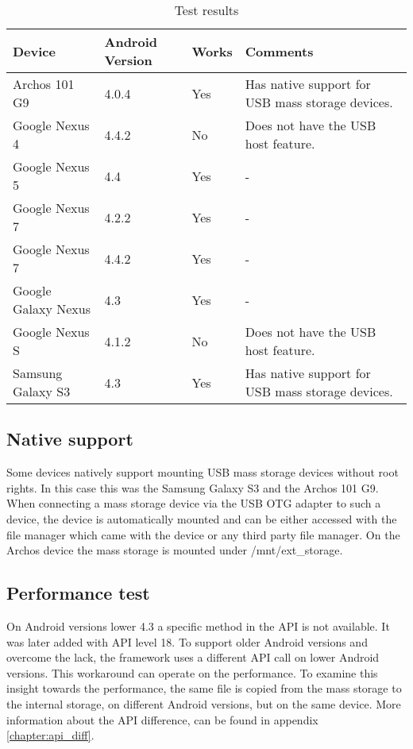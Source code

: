 \begin{table}[ht]
\caption{Test results}
\centering
\begin{tabular}{|l|l|l|p{7cm}|}
\hline\hline
\textbf{Device} & \textbf{Android Version} & \textbf{Works} & \textbf{Comments} \\ \hline
Archos 101 G9 & 4.0.4 & Yes & Has native support for USB mass storage devices. \\ \hline
Google Nexus 4 & 4.4.2 & No & Does not have the USB host feature\cite{nexus_4_usb_host}. \\ \hline
Google Nexus 5 & 4.4 & Yes & - \\ \hline
Google Nexus 7 & 4.2.2 & Yes & - \\ \hline
Google Nexus 7 & 4.4.2 & Yes & - \\ \hline
Google Galaxy Nexus & 4.3 & Yes & - \\ \hline
Google Nexus S & 4.1.2 & No & Does not have the USB host feature. \\ \hline
Samsung Galaxy S3 & 4.3 & Yes & Has native support for USB mass storage devices. \\ \hline
\end{tabular}
\label{table:test_results}
\end{table}

\subsection{Native support}

Some devices natively support mounting USB mass storage devices without root rights. In this case this was the Samsung Galaxy S3 and the Archos 101 G9. When connecting a mass storage device via the USB OTG adapter to such a device, the device is automatically mounted and can be either accessed with the file manager which came with the device or any third party file manager. On the Archos device the mass storage is mounted under /mnt/ext\_storage.

\subsection{Performance test}

On Android versions lower 4.3 a specific method in the API is not available. It was later added with API level 18. To support older Android versions and overcome the lack, the framework uses a different API call on lower Android versions. This workaround can operate on the performance. To examine this insight towards the performance, the same file is copied from the mass storage to the internal storage, on different Android versions, but on the same device. More information about the API difference, can be found in appendix \ref{chapter:api_diff}.

